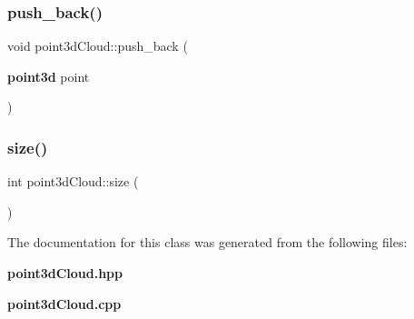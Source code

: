 \mbox{\label{classpoint3d_cloud_a84c558258478bc6728e6545d8f4b8d02}} 
\subsubsection{push\+\_\+back()}
{\footnotesize\ttfamily void point3d\+Cloud\+::push\+\_\+back (\begin{DoxyParamCaption}\item[{\textbf{ point3d}}]{point }\end{DoxyParamCaption})}

\mbox{\label{classpoint3d_cloud_aa4fe8d4a3f3f93691741e301f767ff7f}} 
\subsubsection{size()}
{\footnotesize\ttfamily int point3d\+Cloud\+::size (\begin{DoxyParamCaption}{ }\end{DoxyParamCaption})}



The documentation for this class was generated from the following files\+:\begin{DoxyCompactItemize}
\item 
\textbf{ point3d\+Cloud.\+hpp}\item 
\textbf{ point3d\+Cloud.\+cpp}\end{DoxyCompactItemize}
